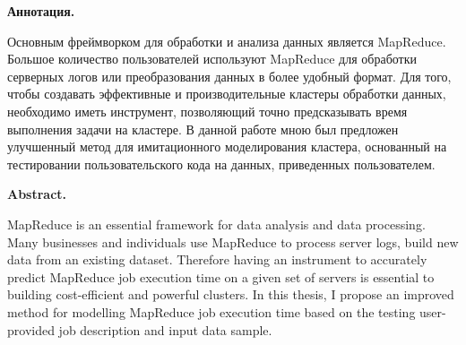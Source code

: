 \documentclass[../diploma.tex]{subfile}
\begin{document}
    {\small\bf
        Аннотация. 

        Основным фреймворком для обработки и анализа данных является MapReduce.
        Большое количество пользователей используют MapReduce для обработки
        серверных логов или преобразования данных в более удобный формат. Для
        того, чтобы создавать эффективные и производительные кластеры обработки
        данных, необходимо иметь инструмент, позволяющий точно предсказывать
        время выполнения задачи на кластере. В данной работе мною был предложен
        улучшенный метод для имитационного моделирования кластера, основанный на
        тестировании пользовательского кода на данных, приведенных
        пользователем.
    }

    
    {\small\bf
        Abstract.
            
        MapReduce is an essential framework for data analysis and data
        processing. Many businesses and individuals use MapReduce to process
        server logs, build new data from an existing dataset. Therefore having
        an instrument to accurately predict MapReduce job execution time on a
        given set of servers is essential to building cost-efficient and
        powerful clusters. In this thesis, I propose an improved method for
        modelling MapReduce job execution time based on the testing
        user-provided job description and input data sample.
    }
\end{document}
